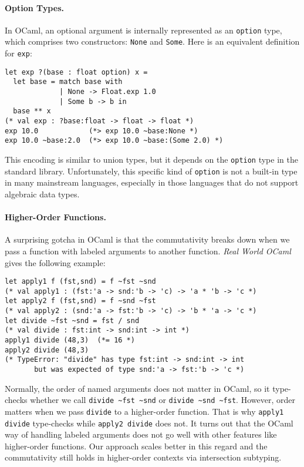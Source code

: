 \paragraph{Option Types.}
In OCaml, an optional argument is internally represented as an \lstinline{option}
type, which comprises two constructors: \lstinline{None} and \lstinline{Some}.
Here is an equivalent definition for \lstinline{exp}:

\begin{lstlisting}[language={[Objective]Caml}]
let exp ?(base : float option) x =
  let base = match base with
             | None -> Float.exp 1.0
             | Some b -> b in
  base ** x
(* val exp : ?base:float -> float -> float *)
exp 10.0            (*> exp 10.0 ~base:None *)
exp 10.0 ~base:2.0  (*> exp 10.0 ~base:(Some 2.0) *)
\end{lstlisting}

\noindent This encoding is similar to union types, but it depends on the
\lstinline{option} type in the standard library. Unfortunately, this specific
kind of \lstinline{option} is not a built-in type in many mainstream languages,
especially in those languages that do not support algebraic data types.

\paragraph{Higher-Order Functions.}
A surprising gotcha in OCaml is that the commutativity breaks down when we pass
a function with labeled arguments to another function. \emph{Real World
OCaml}~\citep{madhavapeddy2022real} gives the following example:
\begin{lstlisting}[language={[Objective]Caml}]
let apply1 f (fst,snd) = f ~fst ~snd
(* val apply1 : (fst:'a -> snd:'b -> 'c) -> 'a * 'b -> 'c *)
let apply2 f (fst,snd) = f ~snd ~fst
(* val apply2 : (snd:'a -> fst:'b -> 'c) -> 'b * 'a -> 'c *)
let divide ~fst ~snd = fst / snd
(* val divide : fst:int -> snd:int -> int *)
apply1 divide (48,3)  (*= 16 *)
apply2 divide (48,3)
(* TypeError: "divide" has type fst:int -> snd:int -> int
       but was expected of type snd:'a -> fst:'b -> 'c *)
\end{lstlisting}
Normally, the order of named arguments does not matter in OCaml, so it
type-checks whether we call \lstinline{divide ~fst ~snd} or
\lstinline{divide ~snd ~fst}. However, order matters when we pass
\lstinline{divide} to a higher-order function. That is why
\lstinline{apply1 divide} type-checks while \lstinline{apply2 divide} does not.
It turns out that the OCaml way of handling labeled arguments does not go well
with other features like higher-order functions. Our approach scales better in
this regard and the commutativity still holds in higher-order contexts via
intersection subtyping.

